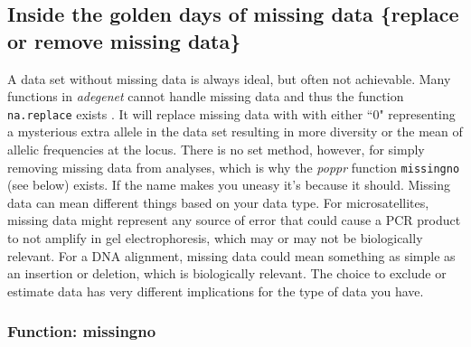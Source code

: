 \documentclass[letterpaper]{article}\usepackage[]{graphicx}\usepackage[]{color}
\newcommand{\tab}{\hspace*{1em}}
\begin{document}
\subsection{Inside the golden days of missing data \{replace or remove missing data\}}\label{data.manip:missing}

\tab\tab A data set without missing data is always ideal, but often not achievable. Many functions in \textit{adegenet} cannot handle missing data and thus the function \texttt{na.replace} exists \cite{Jombart:2008}. It will replace missing data with with either ``0" representing a mysterious extra allele in the data set resulting in more diversity or the mean of allelic frequencies at the locus. There is no set method, however, for simply removing missing data from analyses, which is why the \textit{poppr} function \texttt{missingno} (see below) exists. If the name makes you uneasy it's because it should. Missing data can mean different things based on your data type. For microsatellites, missing data might represent any source of error that could cause a PCR product to not amplify in gel electrophoresis, which may or may not be biologically relevant. For a DNA alignment, missing data could mean something as simple as an insertion or deletion, which is biologically relevant. The choice to exclude or estimate data has very different implications for the type of data you have.
\subsubsection{Function: missingno}\label{data.manip:missing:missingno}
\end{document}
